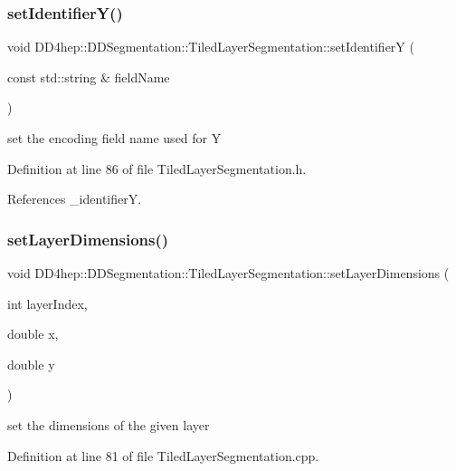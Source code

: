 \subsubsection{\texorpdfstring{set\+Identifier\+Y()}{setIdentifierY()}}
{\footnotesize\ttfamily void D\+D4hep\+::\+D\+D\+Segmentation\+::\+Tiled\+Layer\+Segmentation\+::set\+IdentifierY (\begin{DoxyParamCaption}\item[{const std\+::string \&}]{field\+Name }\end{DoxyParamCaption})\hspace{0.3cm}{\ttfamily [inline]}}



set the encoding field name used for Y 



Definition at line 86 of file Tiled\+Layer\+Segmentation.\+h.



References \+\_\+identifierY.

\hypertarget{class_d_d4hep_1_1_d_d_segmentation_1_1_tiled_layer_segmentation_a579736d34689d340d8d4dba0b30da4ba}{}\label{class_d_d4hep_1_1_d_d_segmentation_1_1_tiled_layer_segmentation_a579736d34689d340d8d4dba0b30da4ba} 
\subsubsection{\texorpdfstring{set\+Layer\+Dimensions()}{setLayerDimensions()}}
{\footnotesize\ttfamily void D\+D4hep\+::\+D\+D\+Segmentation\+::\+Tiled\+Layer\+Segmentation\+::set\+Layer\+Dimensions (\begin{DoxyParamCaption}\item[{int}]{layer\+Index,  }\item[{double}]{x,  }\item[{double}]{y }\end{DoxyParamCaption})}



set the dimensions of the given layer 



Definition at line 81 of file Tiled\+Layer\+Segmentation.\+cpp.




